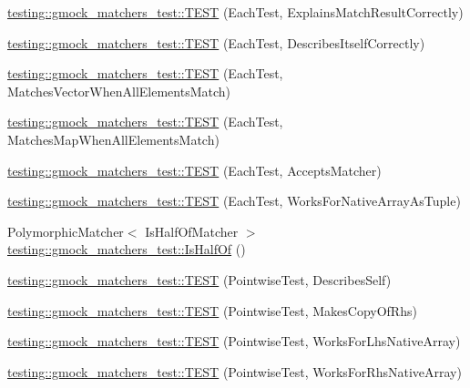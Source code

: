 \begin{DoxyCompactItemize}
\item 
\hyperlink{namespacetesting_1_1gmock__matchers__test_adf46df588332aa839b52af952fface1a}{testing\+::gmock\+\_\+matchers\+\_\+test\+::\+T\+E\+ST} (Each\+Test, Explains\+Match\+Result\+Correctly)
\item 
\hyperlink{namespacetesting_1_1gmock__matchers__test_a183c4b7acec060c6fe3dee650bc97e6d}{testing\+::gmock\+\_\+matchers\+\_\+test\+::\+T\+E\+ST} (Each\+Test, Describes\+Itself\+Correctly)
\item 
\hyperlink{namespacetesting_1_1gmock__matchers__test_a1310e7e85bf8ea8f2281850167e15465}{testing\+::gmock\+\_\+matchers\+\_\+test\+::\+T\+E\+ST} (Each\+Test, Matches\+Vector\+When\+All\+Elements\+Match)
\item 
\hyperlink{namespacetesting_1_1gmock__matchers__test_a53e7c1a04b8f178af52eeaa9f190cb64}{testing\+::gmock\+\_\+matchers\+\_\+test\+::\+T\+E\+ST} (Each\+Test, Matches\+Map\+When\+All\+Elements\+Match)
\item 
\hyperlink{namespacetesting_1_1gmock__matchers__test_a74f7c802ddb6879d3c76ff08d3e242b9}{testing\+::gmock\+\_\+matchers\+\_\+test\+::\+T\+E\+ST} (Each\+Test, Accepts\+Matcher)
\item 
\hyperlink{namespacetesting_1_1gmock__matchers__test_aef6eeafb03f698d16206836bbb6f05b9}{testing\+::gmock\+\_\+matchers\+\_\+test\+::\+T\+E\+ST} (Each\+Test, Works\+For\+Native\+Array\+As\+Tuple)
\item 
Polymorphic\+Matcher$<$ Is\+Half\+Of\+Matcher $>$ \hyperlink{namespacetesting_1_1gmock__matchers__test_ace0a8f64b108c7a9c32c2cac15185461}{testing\+::gmock\+\_\+matchers\+\_\+test\+::\+Is\+Half\+Of} ()
\item 
\hyperlink{namespacetesting_1_1gmock__matchers__test_a2c4c39058405e13e6c6b7fcf8e6bfe43}{testing\+::gmock\+\_\+matchers\+\_\+test\+::\+T\+E\+ST} (Pointwise\+Test, Describes\+Self)
\item 
\hyperlink{namespacetesting_1_1gmock__matchers__test_a9be60ebc74e280d7eb6668bfa316a765}{testing\+::gmock\+\_\+matchers\+\_\+test\+::\+T\+E\+ST} (Pointwise\+Test, Makes\+Copy\+Of\+Rhs)
\item 
\hyperlink{namespacetesting_1_1gmock__matchers__test_ad0e797104a482eba2d6c137cf9b676a5}{testing\+::gmock\+\_\+matchers\+\_\+test\+::\+T\+E\+ST} (Pointwise\+Test, Works\+For\+Lhs\+Native\+Array)
\item 
\hyperlink{namespacetesting_1_1gmock__matchers__test_adabf6a3ceda0024d630d2ece31e37f7c}{testing\+::gmock\+\_\+matchers\+\_\+test\+::\+T\+E\+ST} (Pointwise\+Test, Works\+For\+Rhs\+Native\+Array)

\end{DoxyCompactItemize}
